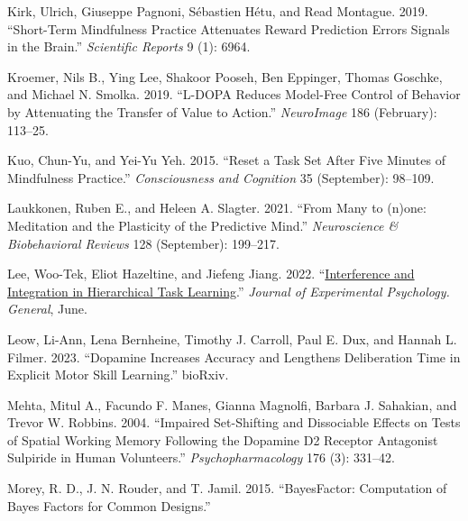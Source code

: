 \documentclass{article}
\newlength{\cslhangindent}
\newlength{\cslentryspacingunit} %
\newenvironment{CSLReferences}[2] %
 {%
  \setlength{\parindent}{0pt}
  \ifodd #1
  \let\oldpar\par
  \def\par{\hangindent=\cslhangindent\oldpar}
  \fi
  \setlength{\parskip}{#2\cslentryspacingunit}
 }%
 {}
\begin{document}
\begin{CSLReferences}{1}{0}
\leavevmode{}%
Kirk, Ulrich, Giuseppe Pagnoni, Sébastien Hétu, and Read Montague. 2019.
{``Short-Term Mindfulness Practice Attenuates Reward Prediction Errors
Signals in the Brain.''} \emph{Scientific Reports} 9 (1): 6964.

\leavevmode{}%
Kroemer, Nils B., Ying Lee, Shakoor Pooseh, Ben Eppinger, Thomas
Goschke, and Michael N. Smolka. 2019. {``L-{DOPA} Reduces Model-Free
Control of Behavior by Attenuating the Transfer of Value to Action.''}
\emph{NeuroImage} 186 (February): 113--25.

\leavevmode{}%
Kuo, Chun-Yu, and Yei-Yu Yeh. 2015. {``Reset a Task Set After Five
Minutes of Mindfulness Practice.''} \emph{Consciousness and Cognition}
35 (September): 98--109.

\leavevmode{}%
Laukkonen, Ruben E., and Heleen A. Slagter. 2021. {``From Many to
(n)one: {Meditation} and the Plasticity of the Predictive Mind.''}
\emph{Neuroscience \& Biobehavioral Reviews} 128 (September): 199--217.

\leavevmode{}%
Lee, Woo-Tek, Eliot Hazeltine, and Jiefeng Jiang. 2022.
{``\href{https://www.ncbi.nlm.nih.gov/pubmed/35737531}{Interference and
Integration in Hierarchical Task Learning}.''} \emph{Journal of
Experimental Psychology. General}, June.

\leavevmode{}%
Leow, Li-Ann, Lena Bernheine, Timothy J. Carroll, Paul E. Dux, and
Hannah L. Filmer. 2023. {``Dopamine Increases Accuracy and Lengthens
Deliberation Time in Explicit Motor Skill Learning.''} {bioRxiv}.

\leavevmode{}%
Mehta, Mitul A., Facundo F. Manes, Gianna Magnolfi, Barbara J. Sahakian,
and Trevor W. Robbins. 2004. {``Impaired Set-Shifting and Dissociable
Effects on Tests of Spatial Working Memory Following the Dopamine {D2}
Receptor Antagonist Sulpiride in Human Volunteers.''}
\emph{Psychopharmacology} 176 (3): 331--42.

\leavevmode{}%
Morey, R. D., J. N. Rouder, and T. Jamil. 2015. {``{BayesFactor}:
{Computation} of {Bayes Factors} for {Common Designs}.''}


\end{CSLReferences}
\end{document}
